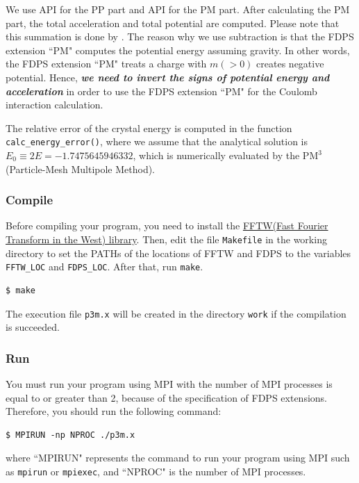 \endifC
\ifIF
We use API  for the PP part and API  for the PM part. After calculating the PM part, the total acceleration and total potential are computed. Please note that this summation is done by . The reason why we use subtraction is that the FDPS extension ``\textsf{PM}" computes the potential energy assuming gravity. In other words, the FDPS extension ``\textsf{PM}" treats a charge with $m(>0)$ creates negative potential. Hence, \textit{\textbf{we need to invert the signs of potential energy and acceleration}} in order to use the FDPS extension ``\textsf{PM}" for the Coulomb interaction calculation.

\endifIF


The relative error of the crystal energy is computed in the function \texttt{calc\_energy\_error()}, where we assume that the analytical solution is $E_{0}\equiv 2E =-1.7475645946332$, which is numerically evaluated by the $\mathrm{PM^{3}}$(Particle-Mesh Multipole Method).

\subsubsection{Compile}
Before compiling your program, you need to install the \href{http://www.fftw.org}{FFTW(Fast Fourier Transform in the West) library}. Then, edit the file \texttt{Makefile} in the working directory to set the PATHs of the locations of FFTW and FDPS to the variables \texttt{FFTW\_LOC} and \texttt{FDPS\_LOC}. After that, run \texttt{make}.
\begin{screen}
\begin{verbatim}
$ make
\end{verbatim}
\end{screen}
The execution file \texttt{p3m.x} will be created in the directory \texttt{work} if the compilation is succeeded.

\subsubsection{Run}
You must run your program using MPI with the number of MPI processes is equal to or greater than 2, because of the specification of FDPS extensions. Therefore, you should run the following command:
\begin{screen}
\begin{verbatim}
$ MPIRUN -np NPROC ./p3m.x
\end{verbatim}
\end{screen}
where ``MPIRUN" represents the command to run your program using MPI such as \texttt{mpirun} or \texttt{mpiexec}, and ``NPROC" is the number of MPI processes.

